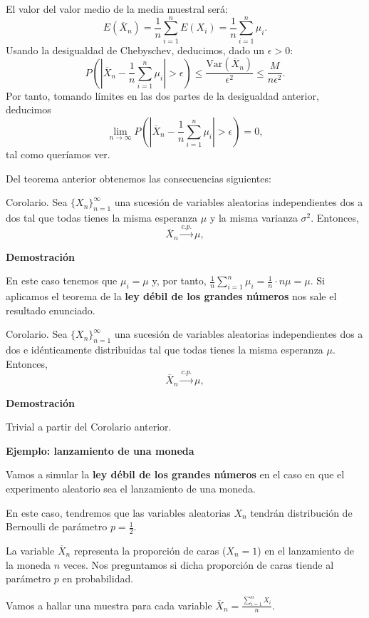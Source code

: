 \documentclass[
  letterpaper,
  DIV=11,
  numbers=noendperiod]{scrreprt}
\begin{document}
El valor del valor medio de la media muestral será: \[
E(\overline{X}_n)=\frac{1}{n}\sum_{i=1}^n E(X_i)=\frac{1}{n}\sum_{i=1}^n \mu_i. 
\] Usando la desigualdad de Chebyschev, deducimos, dado un
\(\epsilon >0\): \[
P\left(\left|\overline{X}_n-\frac{1}{n}\sum_{i=1}^n \mu_i\right|>\epsilon\right) \leq \frac{\mathrm{Var}(\overline{X}_n)}{\epsilon^2}\leq \frac{M}{n\epsilon^2}.
\] Por tanto, tomando límites en las dos partes de la desigualdad
anterior, deducimos \[
\lim_{n\to \infty}P\left(\left|\overline{X}_n-\frac{1}{n}\sum_{i=1}^n \mu_i\right|>\epsilon\right) =0,
\] tal como queríamos ver.

Del teorema anterior obtenemos las consecuencias siguientes:

Corolario. Sea \(\{X_n\}_{n=1}^\infty\) una sucesión de variables
aleatorias independientes dos a dos tal que todas tienes la misma
esperanza \(\mu\) y la misma varianza \(\sigma^2\). Entonces, \[
\overline{X}_n\stackrel{c.p.}{\longrightarrow} \mu,
\]

\textbf{Demostración}

En este caso tenemos que \(\mu_i=\mu\) y, por tanto,
\(\frac{1}{n}\sum\limits_{i=1}^n \mu_i =\frac{1}{n}\cdot n\mu=\mu\). Si
aplicamos el teorema de la \textbf{ley débil de los grandes números} nos
sale el resultado enunciado.

Corolario. Sea \(\{X_n\}_{n=1}^\infty\) una sucesión de variables
aleatorias independientes dos a dos e idénticamente distribuidas tal que
todas tienes la misma esperanza \(\mu\). Entonces, \[
\overline{X}_n\stackrel{c.p.}{\longrightarrow} \mu,
\]

\textbf{Demostración}

Trivial a partir del Corolario anterior.

\textbf{Ejemplo: lanzamiento de una moneda}

Vamos a simular la \textbf{ley débil de los grandes números} en el caso
en que el experimento aleatorio sea el lanzamiento de una moneda.

En este caso, tendremos que las variables aleatorias \(X_n\) tendrán
distribución de Bernoulli de parámetro \(p=\frac{1}{2}\).

La variable \(\overline{X}_n\) representa la proporción de caras
(\(X_n=1\)) en el lanzamiento de la moneda \(n\) veces. Nos preguntamos
si dicha proporción de caras tiende al parámetro \(p\) en probabilidad.

Vamos a hallar una muestra para cada variable
\(\overline{X}_n=\frac{\sum\limits_{i=1}^n X_i}{n}\).
\end{document}
